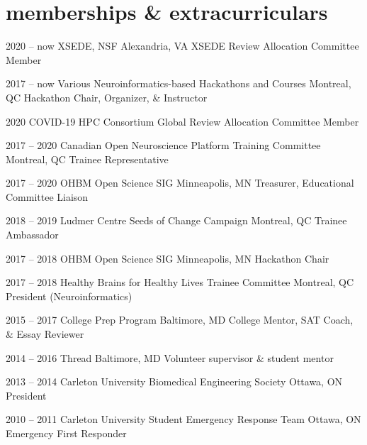 \documentclass[]{friggeri-cv} %
\begin{document}
\section{memberships \& extracurriculars}

\begin{entrylist}
\entry
{2020 -- now}
{XSEDE, NSF}
{Alexandria, VA}
{XSEDE Review Allocation Committee Member}

\entry
{2017 -- now}
{Various Neuroinformatics-based Hackathons and Courses}
{Montreal, QC}
{Hackathon Chair, Organizer, \& Instructor}

\entry
{2020}
{COVID-19 HPC Consortium}
{Global}
{Review Allocation Committee Member}

\entry
{2017 -- 2020}
{Canadian Open Neuroscience Platform Training Committee}
{Montreal, QC}
{Trainee Representative}

\entry
{2017 -- 2020}
{OHBM Open Science SIG}
{Minneapolis, MN}
{Treasurer, Educational Committee Liaison}

\entry
{2018 -- 2019}
{Ludmer Centre Seeds of Change Campaign}
{Montreal, QC}
{Trainee Ambassador}

\entry
{2017 -- 2018}
{OHBM Open Science SIG}
{Minneapolis, MN}
{Hackathon Chair}

\entry
{2017 -- 2018}
{Healthy Brains for Healthy Lives Trainee Committee}
{Montreal, QC}
{President (Neuroinformatics)}

\entry
{2015 -- 2017}
{College Prep Program}
{Baltimore, MD}
{College Mentor, SAT Coach, \& Essay Reviewer}

\entry
{2014 -- 2016}
{Thread}
{Baltimore, MD}
{Volunteer supervisor \& student mentor}

\entry
{2013 -- 2014}
{Carleton University Biomedical Engineering Society}
{Ottawa, ON}
{President}

\entry
{2010 -- 2011}
{Carleton University Student Emergency Response Team}
{Ottawa, ON}
{Emergency First Responder}
\end{entrylist}

\end{document}
